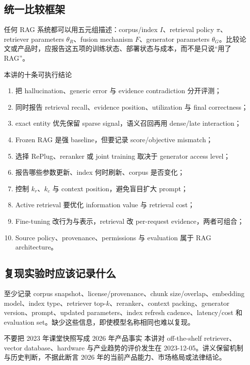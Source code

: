 \documentclass[a4paper]{article}
\begin{document}
\subsection{统一比较框架}

任何 RAG 系统都可以用五元组描述：corpus/index $I$、retrieval policy $\pi$、retriever parameters $\theta_R$、fusion mechanism $F$、generator parameters $\theta_G$。比较论文或产品时，应报告这五项的训练状态、部署状态与成本，而不是只说“用了 RAG”。

\begin{importantbox}{本讲的十条可执行结论}
\begin{enumerate}
  \item 把 hallucination、generic error 与 evidence contradiction 分开评测；
  \item 同时报告 retrieval recall、evidence position、utilization 与 final correctness；
  \item exact entity 优先保留 sparse signal，语义召回再用 dense/late interaction；
  \item Frozen RAG 是强 baseline，但要记录 score/objective mismatch；
  \item 选择 RePlug、reranker 或 joint training 取决于 generator access level；
  \item 报告哪些参数更新、index 何时刷新、corpus 是否变化；
  \item 控制 $k_r$、$k_c$ 与 context position，避免盲目扩大 prompt；
  \item Active retrieval 要优化 information value 与 retrieval cost；
  \item Fine-tuning 改行为与表示，retrieval 改 per-request evidence，两者可组合；
  \item Source policy、provenance、permissions 与 evaluation 属于 RAG architecture。
\end{enumerate}
\end{importantbox}

\subsection{复现实验时应该记录什么}

至少记录 corpus snapshot、license/provenance、chunk size/overlap、embedding model、index type、retriever top-$k$、reranker、context packing、generator version、prompt、updated parameters、index refresh cadence、latency/cost 和 evaluation set。缺少这些信息，即使模型名称相同也难以复现。

\begin{warningbox}{不要把 2023 年课堂快照写成 2026 年产品事实}
本讲对 off-the-shelf retriever、vector database、hardware 与产业趋势的评价发生在 2023-12-05。讲义保留机制与历史判断，不据此断言 2026 年的当前产品能力、市场格局或法律结论。
\end{warningbox}
\end{document}
